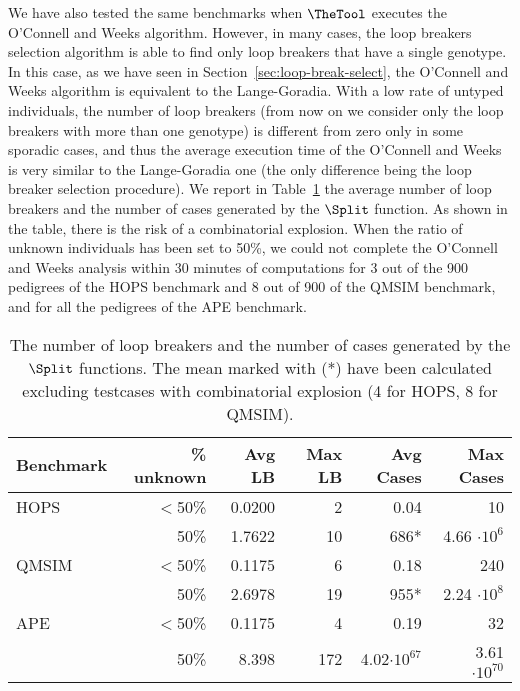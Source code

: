 We have also tested the same benchmarks when {$\TheTool$} executes the O'Connell and
Weeks algorithm. However, in many cases, the loop breakers selection algorithm
is able to find only loop breakers that have a single genotype. In this case, as
we have seen in Section~\ref{sec:loop-break-select}, the O'Connell and Weeks
algorithm is equivalent to the Lange-Goradia. With a low rate of untyped
individuals, the number of loop breakers (from now on we consider only the loop
breakers with more than one genotype) is different from zero only in some
sporadic cases, and thus the average execution time of the O'Connell and Weeks
is very similar to the Lange-Goradia one (the only difference being the loop
breaker selection procedure). We report in Table~\ref{tab:avglb} the average
number of loop breakers and the number of cases generated by the $\Split$
function. As shown in the table, there is the risk of a combinatorial
explosion. When the ratio of unknown individuals has been set to 50\%, we could
not complete the O'Connell and Weeks analysis within 30 minutes of computations
for 3 out of the 900 pedigrees of the HOPS benchmark and 8 out of 900 of the
QMSIM benchmark, and for all the pedigrees of the APE benchmark. 

\begin{table}
  \centering
  \begin{tabular}{lrrrrr}
    \textbf{Benchmark}&\textbf{\% unknown}&\textbf{Avg LB}&\textbf{Max
      LB}&\textbf{Avg Cases}&\textbf{Max Cases}\\\hline 
    HOPS   & $<$50\% & 0.0200 & 2   & 0.04                & 10                   \\
           & 50\%    & 1.7622 & 10  & 686*                & 4.66 $\cdot 10^6$    \\\hline
    QMSIM & $<$50\% & 0.1175 & 6   & 0.18                & 240                  \\
           & 50\%    & 2.6978 & 19  & 955*                & 2.24 $\cdot 10^8$    \\\hline
    APE    & $<$50\% & 0.1175 & 4   & 0.19                & 32                   \\
           & 50\%    & 8.398  & 172 & 4.02$\cdot 10^{67}$ & 3.61 $\cdot 10^{70}$ \\\hline
  \end{tabular}
  \caption{The number of loop breakers and the number of cases generated by the
    ${\Split}$ functions. The mean marked with (*) have been calculated
    excluding testcases with combinatorial explosion (4 for HOPS, 8 for QMSIM).}
\label{tab:avglb}
\end{table}

